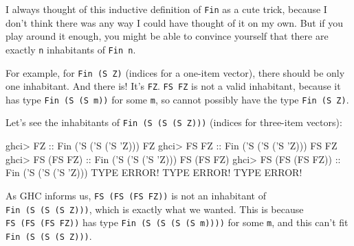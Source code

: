 \documentclass[]{article}
\newenvironment{Shaded}{}{}
\newcommand{\DataTypeTok}[1]{\textcolor[rgb]{0.56,0.13,0.00}{#1}}
\newcommand{\CharTok}[1]{\textcolor[rgb]{0.25,0.44,0.63}{#1}}
\newcommand{\OtherTok}[1]{\textcolor[rgb]{0.00,0.44,0.13}{#1}}
\newcommand{\FunctionTok}[1]{\textcolor[rgb]{0.02,0.16,0.49}{#1}}
\newcommand{\NormalTok}[1]{#1}
\begin{document}
I always thought of this inductive definition of \texttt{Fin} as a cute trick,
because I don't think there was any way I could have thought of it on my own.
But if you play around it enough, you might be able to convince yourself that
there are exactly \texttt{n} inhabitants of \texttt{Fin\ n}.

For example, for \texttt{Fin\ (\textquotesingle{}S\ \textquotesingle{}Z)}
(indices for a one-item vector), there should be only one inhabitant. And there
is! It's \texttt{FZ}. \texttt{FS\ FZ} is not a valid inhabitant, because it has
type \texttt{Fin\ (\textquotesingle{}S\ (\textquotesingle{}S\ m))} for some
\texttt{m}, so cannot possibly have the type
\texttt{Fin\ (\textquotesingle{}S\ \textquotesingle{}Z)}.

Let's see the inhabitants of
\texttt{Fin\ (\textquotesingle{}S\ (\textquotesingle{}S\ (\textquotesingle{}S\ \textquotesingle{}Z)))}
(indices for three-item vectors):

\begin{Shaded}
\begin{Highlighting}[]
\NormalTok{ghci}\FunctionTok{>} \DataTypeTok{FZ}\OtherTok{              ::} \DataTypeTok{Fin}\NormalTok{ (}\CharTok{'S ('}\DataTypeTok{S}\NormalTok{ (}\CharTok{'S '}\DataTypeTok{Z}\NormalTok{)))}
\DataTypeTok{FZ}
\NormalTok{ghci}\FunctionTok{>} \DataTypeTok{FS} \DataTypeTok{FZ}\OtherTok{           ::} \DataTypeTok{Fin}\NormalTok{ (}\CharTok{'S ('}\DataTypeTok{S}\NormalTok{ (}\CharTok{'S '}\DataTypeTok{Z}\NormalTok{)))}
\DataTypeTok{FS} \DataTypeTok{FZ}
\NormalTok{ghci}\FunctionTok{>} \DataTypeTok{FS}\NormalTok{ (}\DataTypeTok{FS} \DataTypeTok{FZ}\NormalTok{)}\OtherTok{      ::} \DataTypeTok{Fin}\NormalTok{ (}\CharTok{'S ('}\DataTypeTok{S}\NormalTok{ (}\CharTok{'S '}\DataTypeTok{Z}\NormalTok{)))}
\DataTypeTok{FS}\NormalTok{ (}\DataTypeTok{FS} \DataTypeTok{FZ}\NormalTok{)}
\NormalTok{ghci}\FunctionTok{>} \DataTypeTok{FS}\NormalTok{ (}\DataTypeTok{FS}\NormalTok{ (}\DataTypeTok{FS} \DataTypeTok{FZ}\NormalTok{))}\OtherTok{ ::} \DataTypeTok{Fin}\NormalTok{ (}\CharTok{'S ('}\DataTypeTok{S}\NormalTok{ (}\CharTok{'S '}\DataTypeTok{Z}\NormalTok{)))}
\DataTypeTok{TYPE} \DataTypeTok{ERROR}\FunctionTok{!}  \DataTypeTok{TYPE} \DataTypeTok{ERROR}\FunctionTok{!}  \DataTypeTok{TYPE} \DataTypeTok{ERROR}\FunctionTok{!}
\end{Highlighting}
\end{Shaded}

As GHC informs us, \texttt{FS\ (FS\ (FS\ FZ))} is not an inhabitant of
\texttt{Fin\ (\textquotesingle{}S\ (\textquotesingle{}S\ (\textquotesingle{}S\ \textquotesingle{}Z)))},
which is exactly what we wanted. This is because \texttt{FS\ (FS\ (FS\ FZ))} has
type
\texttt{Fin\ (\textquotesingle{}S\ (\textquotesingle{}S\ (\textquotesingle{}S\ (\textquotesingle{}S\ m))))}
for some \texttt{m}, and this can't fit
\texttt{Fin\ (\textquotesingle{}S\ (\textquotesingle{}S\ (\textquotesingle{}S\ \textquotesingle{}Z)))}.
\end{document}
